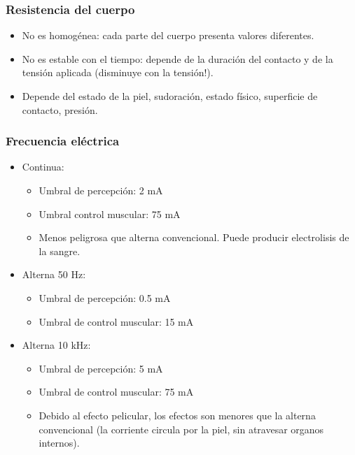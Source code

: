 \documentclass[serif, xcolor=dvipsnames]{beamer}
\begin{document}
\begin{frame}
\frametitle{Resistencia del cuerpo}
\begin{itemize}
\item No es homogénea: cada parte del cuerpo presenta valores diferentes.
\item No es estable con el tiempo: depende de la duración del contacto y
de la tensión aplicada (disminuye con la tensión!).
\item Depende del estado de la piel, sudoración, estado físico, superficie
de contacto, presión.
\end{itemize}

\end{frame}

\begin{frame}
\frametitle{Frecuencia eléctrica}
\begin{itemize}
\item Continua:

\begin{itemize}
\item Umbral de percepción: 2 mA
\item Umbral control muscular: 75 mA
\item Menos peligrosa que alterna convencional. Puede producir electrolisis
de la sangre.
\end{itemize}
\item Alterna 50 Hz:

\begin{itemize}
\item Umbral de percepción: 0.5 mA
\item Umbral de control muscular: 15 mA
\end{itemize}
\item Alterna 10 kHz:

\begin{itemize}
\item Umbral de percepción: 5 mA
\item Umbral de control muscular: 75 mA
\item Debido al efecto pelicular, los efectos son menores que la alterna
convencional (la corriente circula por la piel, sin atravesar organos
internos).
\end{itemize}
\end{itemize}

\end{frame}
\end{document}

